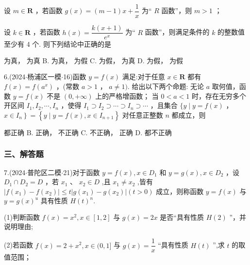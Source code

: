    设 $m \in  \mathbf{R}$ ，若函数 $g\left( x\right)  = \left( {m - 1}\right) x + \dfrac{1}{x}$ 为“ $R$ 函数”，则 $m > 1$ ；

   设 $k \in  \mathbf{R}$ ，若函数 $h\left( x\right)  = \dfrac{k\left( {x + 1}\right) }{{{e}}^{x}}$ 为“ $R$ 函数”，则满足条件的 $k$ 的整数值至少有 4 个. 则下列结论中正确的是 \dotfill{(\kh{})}

\xx{}{}{}{}  为真，  为真 B.   为真，  为假 C.   为假，  为真 D.   为假，  为假

6.(2024$\cdot$杨浦区一模$\cdot$16)函数 $y = f\left( x\right)$ 满足:对于任意 $x \in  \mathbf{R}$ 都有 $f\left( x\right)  = f\left( {a}^{x}\right)$ ，(常数 $a > 1$ ， $a \neq  1)$. 给出以下两个命题:   无论 $a$ 取何值，函数 $y = f\left( x\right)$ 不是 $\left( {0, + \infty }\right)$ 上的严格增函数；   当 $0 < a < 1$ 时，存在无穷多个开区间 ${I}_{1},{I}_{2},\cdots ,{I}_{n}$ ，使得 ${I}_{1} \supset  {I}_{2} \supset  \cdots  \supset  {I}_{n} \supset  \cdots$ ，且集合 $\{ y \mid  y = f\left( x\right)$ ， $\left. {x \in  {I}_{n}}\right\}   = \left\{  {y \mid  y = f\left( x\right) ,x \in  {I}_{n + 1}}\right\}$ 对任意正整数 $n$ 都成立，则 \dotfill{(\kh{})}

\xx{}{}{}{}    都正确 B.   正确，  不正确 C.   不正确，  正确 D.     都不正确

\subsubsection*{三、解答题}

7.(2024$\cdot$普陀区二模$\cdot$21)对于函数 $y = f\left( x\right) ,x \in  {D}_{1}$ 和 $y = g\left( x\right) ,x \in  {D}_{2}$ ，设 ${D}_{1} \cap  {D}_{2} = D$ ，若 ${x}_{1}$ 、 ${x}_{2} \in  D$ ,且 ${x}_{1} \neq  {x}_{2}$ ,皆有 $\left| {f\left( {x}_{1}\right)  - f\left( {x}_{2}\right) }\right|  \leq  t\left| {g\left( {x}_{1}\right)  - g\left( {x}_{2}\right) }\right| \left( {t > 0}\right)$ 成立，则称函数 $y = f\left( x\right)$ 与 $y = g{\left( x\right) }^{u}$ 具有性质 $H{\left( t\right) }^{n}$.

(1)判断函数 $f\left( x\right)  = {x}^{2},x \in  \left\lbrack  {1,2}\right\rbrack$ 与 $g\left( x\right)  = {2x}$ 是否“具有性质 $H\left( 2\right)$ ”，并说明理由;

(2)若函数 $f\left( x\right)  = 2 + {x}^{2},x \in  (0,1\rbrack$ 与 $g\left( x\right)  = \dfrac{1}{x}$ “具有性质 $H\left( t\right)$ ”,求 $t$ 的取值范围；

